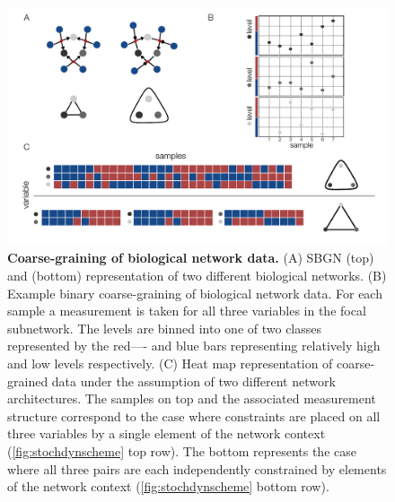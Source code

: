 \begin{figure}[!ht]
\centering
\noindent\includegraphics[width=0.9\columnwidth]{fig/figure_expression_concept.pdf}
\caption{{\bf Coarse-graining of biological network data.} (A) SBGN (top) and \SH{} (bottom) representation of two different biological networks. (B) Example binary coarse-graining of biological network data. For each sample a measurement is taken for all three variables in the focal subnetwork. The levels are binned into one of two classes represented by the red---- and blue bars representing relatively high and low levels respectively. (C) Heat map representation of coarse-grained data under the assumption of two different network architectures. The samples on top and the associated measurement structure correspond to the case where constraints are placed on all three variables by a single element of the network context (\autoref{fig:stochdynscheme} top row). The bottom represents the case where all three pairs are each independently constrained by elements of the network context (\autoref{fig:stochdynscheme} bottom row).}
\label{fig:expression_concept}
\end{figure}

